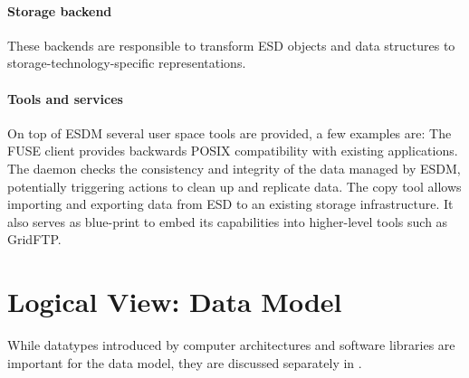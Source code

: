 \paragraph{Storage backend}
These backends are responsible to transform ESD objects and data structures to storage-technology-specific representations.


\paragraph{Tools and services}
On top of ESDM several user space tools are provided, a few examples are:
The FUSE client provides backwards POSIX compatibility with existing applications.
The daemon checks the consistency and integrity of the data managed by ESDM, potentially triggering actions to clean up and replicate data.
The copy tool allows importing and exporting data from ESD to an existing storage infrastructure.
It also serves as blue-print to embed its capabilities into higher-level tools such as GridFTP.





\section{Logical View: Data Model}
\label{sec: viewpoints/logical/data model}


While datatypes introduced by computer architectures and software libraries are important for the data model, they are discussed separately in .



